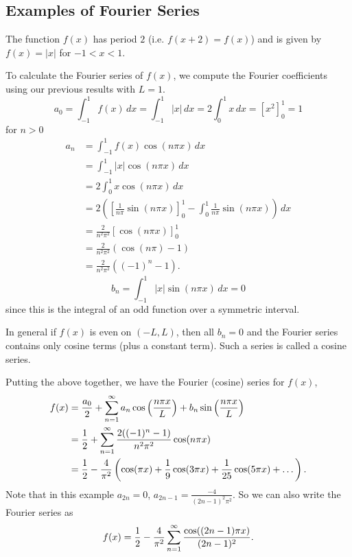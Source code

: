 \documentclass[10pt, a4paper]{article}
\begin{document}
\subsection{Examples of Fourier Series}
\begin{example}
    The function $f(x)$ has period $2$
    (i.e. $f(x + 2) = f(x)$)
    and is given by $f(x) = |x|$ for $-1 < x < 1$.

    \begin{solution}
        
        To calculate the Fourier series of $f(x)$,
        we compute the Fourier coefficients using our previous results with $L = 1$.
        \[
        a_0 = \int_{-1}^{1}f(x)\,dx = \int_{-1}^{1}|x|\,dx = 2\int_{0}^{1}x\,dx = \left[x ^ 2\right]_{0}^{1} = 1
        \]
        for $n > 0$
        \begin{align*}
            a_n &= \int_{-1}^{1}f(x)\cos(n\pi x)\,dx \\
            &= \int_{-1}^{1}|x|\cos(n\pi x)\,dx \\
            &= 2\int_{0}^{1}x\cos(n\pi x)\,dx \\
            &= 2\left(\left[\frac{1}{n\pi}\sin(n\pi x)\right]_{0}^{1} - \int_{0}^{1}\frac{1}{n\pi}\sin(n\pi x)\right)\,dx \\
            &= \frac{2}{n ^ 2\pi ^ 2}\left[\cos(n\pi x)\right]_{0}^{1} \\
            &= \frac{2}{n ^ 2\pi ^ 2}(\cos(n\pi) - 1) \\
            &= \frac{2}{n ^ 2\pi ^ 2}((-1) ^ n - 1).
        \end{align*}
        \[
        b_n = \int_{-1}^{1}|x|\sin(n\pi x)\,dx = 0
        \]
        since this is the integral of an odd function over a symmetric interval.
        
        In general if $f(x)$ is even on $(-L, L)$,
        then all $b_n = 0$ and the Fourier series contains only cosine terms
        (plus a constant term).
        Such a series is called a cosine series.
        
        Putting the above together,
        we have the Fourier
        (cosine)
        series for $f(x)$,
        \begin{align*}
            f(x) &= \frac{a_0}{2} + \infsum[n = 1]a_n\cos\left(\frac{n\pi x}{L}\right) + b_n\sin\left(\frac{n\pi x}{L}\right) \\
            &= \frac{1}{2} + \infsum[n = 1]\frac{2((-1) ^ n - 1)}{n ^ 2\pi ^ 2}\cos(n\pi x) \\
            &= \frac{1}{2} - \frac{4}{\pi ^ 2}\left(\cos(\pi x) + \frac{1}{9}\cos(3\pi x) + \frac{1}{25}\cos(5\pi x) + \dotsc\right).
        \end{align*}
        Note that in this example $a_{2n} = 0$,
        $a_{2n - 1} = \frac{-4}{(2n - 1) ^ 2\pi ^ 2}$.
        So we can also write the Fourier series as
        \[
        f(x) = \frac{1}{2} - \frac{4}{\pi ^ 2}\infsum[n = 1]\frac{\cos((2n - 1)\pi x)}{(2n - 1) ^ 2}.
        \]
    \end{solution}
\end{example}
\end{document}

